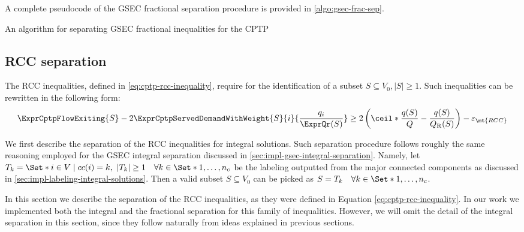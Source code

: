 A complete pseudocode of the GSEC fractional separation procedure is provided in \cref{algo:gsec-frac-sep}.

\begin{algorithm}
	\caption{An algorithm for separating GSEC fractional inequalities for the CPTP}
	\label{algo:gsec-frac-sep}
	
\end{algorithm}

\subsection{RCC separation}
\label{sec:impl-rcc-separation}

The RCC inequalities, defined in \cref{eq:cptp-rcc-inequality},
require for the identification of a subset $S \subseteq V_0, |S| \ge 1$.
Such inequalities can be rewritten in the following form:
\begin{equation}
	\ExprCptpFlowExiting{S} -2 \ExprCptpServedDemandWithWeight{S}{i}{\frac{q_i}{\ExprQr(S)}}    \ge   2 \left( \ceil*{ \frac{q(S)}{Q}} - \frac{q(S)}{Q_{\mathrm{R}}(S)} \right) - \varepsilon_{\mt{RCC}}
\end{equation}

We first describe the separation of the RCC inequalities for integral solutions.
Such separation procedure follows roughly the same reasoning
employed for the GSEC integral separation discussed in \cref{sec:impl-gsec-integral-separation}.
Namely, let $T_k  = \Set*{i \in V \mid cc(i) = k},\ |T_k| \ge 1 \quad \forall k \in \Set*{1, \dots, n_c}$ be the labeling
outputted from the major connected components as discussed in \cref{sec:impl-labeling-integral-solutions}.
Then a valid subset $S \subseteq V_0$ can be picked as $S = T_k \quad \forall k \in \Set*{1, \dots, n_c}$.

In this section we describe the separation of the RCC inequalities, as they were defined in Equation \eqref{eq:cptp-rcc-inequality}.
In our work we implemented both the integral and the fractional separation for this family of inequalities.
However, we will omit the detail of the integral separation in this section, since they follow naturally from ideas explained in previous sections.

